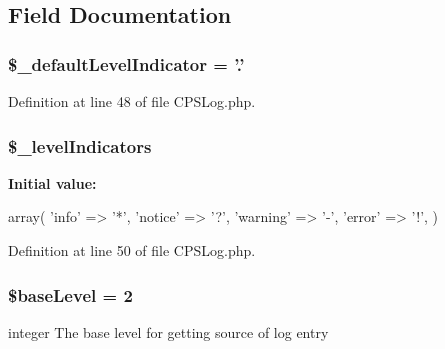 \subsection{Field Documentation}
\hypertarget{classCPSLog_ab5b4a8d574b06602e254fdbaafc83abf}{
\subsubsection[{\$\_\-defaultLevelIndicator}]{\setlength{\rightskip}{0pt plus 5cm}\$\_\-defaultLevelIndicator = '.'}}
\label{classCPSLog_ab5b4a8d574b06602e254fdbaafc83abf}


Definition at line 48 of file CPSLog.php.

\hypertarget{classCPSLog_aa2c4cac0489591ad601a302dcc6c57fb}{
\subsubsection[{\$\_\-levelIndicators}]{\setlength{\rightskip}{0pt plus 5cm}\$\_\-levelIndicators}}
\label{classCPSLog_aa2c4cac0489591ad601a302dcc6c57fb}
{\bfseries Initial value:}
\begin{DoxyCode}
 array(
        'info' => '*',
        'notice' => '?',
        'warning' => '-',
        'error' => '!',
    )
\end{DoxyCode}


Definition at line 50 of file CPSLog.php.

\hypertarget{classCPSLog_a0e25dd3694766f9fb978bfc87d179189}{
\subsubsection[{\$baseLevel}]{\setlength{\rightskip}{0pt plus 5cm}\$baseLevel = 2}}
\label{classCPSLog_a0e25dd3694766f9fb978bfc87d179189}
integer The base level for getting source of log entry 

